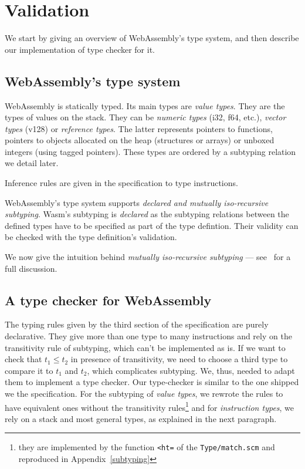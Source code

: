 \documentclass[a4paper,11pt]{article}
\begin{document}
\section{Validation}\label{val}
We start by giving an overview of WebAssembly's type system, and then describe
our implementation of type checker for it.
\subsection{WebAssembly's type system}
WebAssembly is statically typed. Its main types are \emph{value types}. They are
the types of values on the stack. They can be \emph{numeric types}
(\textsf{i32}, \textsf{f64}, etc.), \emph{vector types} (\textsf{v128}) or
\emph{reference types}. The latter represents pointers to functions, pointers to
objects allocated on the heap (structures or arrays) or unboxed integers (using
tagged pointers). These types are ordered by a subtyping relation we detail
later.

Inference rules are given in the specification to type instructions.

WebAssembly's type system supports \emph{declared and mutually iso-recursive
subtyping}.
Wasm's subtyping is \emph{declared} as the subtyping relations between the
defined types have to be specified as part of the type defintion. Their validity
can be checked with the type definition's validation.

We now give the intuition behind \emph{mutually iso-recursive subtyping} ---
see~\cite{rossberg2023mutually} for a full discussion.

\subsection{A type checker for WebAssembly}
The typing rules given by the third section of the specification are purely
declarative. They give more than one type to many instructions and rely on the
transitivity rule of subtyping, which can't be implemented as is. If we want to
check that $t_1 \leq t_2$ in presence of transitivity, we need to choose a third
type to compare it to $t_1$ and $t_2$, which complicates subtyping. We, thus,
needed to adapt them to implement a type checker. Our type-checker is similar to
the one shipped we the specification. For the subtyping of \emph{value types},
we rewrote the rules to have equivalent ones without the transitivity
rules\footnote{they are implemented by the function \texttt{<ht=} of the
\texttt{Type/match.scm} and reproduced in Appendix~\ref{subtyping}} and for
\emph{instruction types}, we rely on a stack and most general types, as
explained in the next paragraph.
\end{document}
